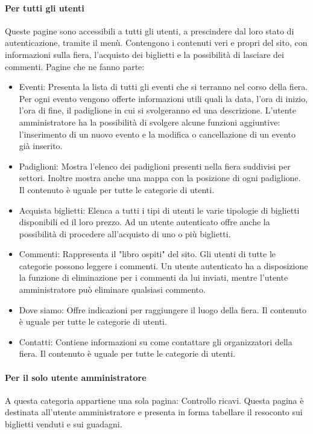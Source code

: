 \paragraph{Per tutti gli utenti}
Queste pagine sono accessibili a tutti gli utenti, a prescindere dal loro stato di autenticazione, tramite il menù.
Contengono i contenuti veri e propri del sito, con informazioni sulla fiera, l'acquisto dei biglietti e la possibilità di lasciare dei commenti.
Pagine che ne fanno parte:
\begin{itemize}
	\item Eventi:
		Presenta la lista di tutti gli eventi che si terranno nel corso della fiera. Per ogni evento vengono offerte informazioni utili quali la data, l'ora di inizio, l'ora di fine, il padiglione in cui si svolgeranno ed una descrizione.
		L'utente amministratore ha la possibilità di svolgere alcune funzioni aggiuntive: l'inserimento di un nuovo evento e la modifica o cancellazione di un evento già inserito.
	\item Padiglioni:
		Mostra l'elenco dei padiglioni presenti nella fiera suddivisi per settori. Inoltre mostra anche una mappa con la posizione di ogni padiglione. Il contenuto è uguale per tutte le categorie di utenti.
	\item Acquista biglietti:
		Elenca a tutti i tipi di utenti le varie tipologie di biglietti disponibili ed il loro prezzo. Ad un utente autenticato offre anche la possibilità di procedere all'acquisto di uno o più biglietti.
	\item Commenti:
		Rappresenta il "libro ospiti" del sito. Gli utenti di tutte le categorie possono leggere i commenti. Un utente autenticato ha a disposizione la funzione di eliminazione per i commenti da lui inviati, mentre l'utente amministratore può eliminare qualsiasi commento.
	\item Dove siamo:
		Offre indicazioni per raggiungere il luogo della fiera. Il contenuto è uguale per tutte le categorie di utenti.
	\item Contatti:
		Contiene informazioni su come contattare gli organizzatori della fiera. Il contenuto è uguale per tutte le categorie di utenti.
\end{itemize}

\paragraph{Per il solo utente amministratore}
A questa categoria appartiene una sola pagina: Controllo ricavi.
Questa pagina è destinata all'utente amministratore e presenta in forma tabellare il resoconto sui biglietti venduti e sui guadagni.

